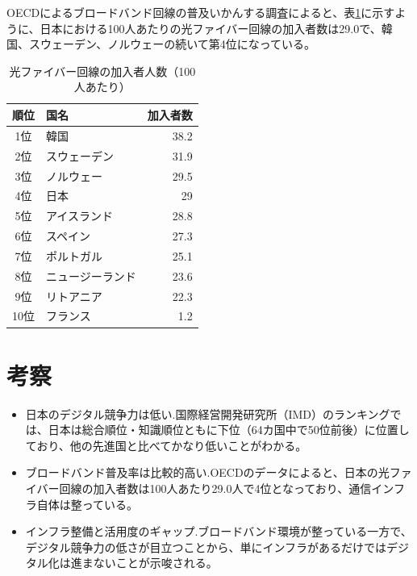\documentclass[a4paper,11pt,dvipdfmx]{ujarticle}
\begin{document}
OECDによるブロードバンド回線の普及いかんする調査\cite{oecd}によると、表\ref{fig:表の挿入}に示すように、日本における100人あたりの光ファイバー回線の加入者数は29.0で、韓国、スウェーデン、ノルウェーの続いて第4位になっている。
\begin{table}[htbp]
     \centering
     \caption{光ファイバー回線の加入者人数（100人あたり）}\label{fig:表の挿入}
     \begin{tabular}{|c|l|r|}
         \hline
          順位 & 国名 & 加入者数 \\
          \hline
          1位 & 韓国 & 38.2 \\
          \hline
         2位 & スウェーデン & 31.9 \\
         \hline
         3位 & ノルウェー & 29.5 \\
         \hline
         4位 & 日本 & 29 \\
         \hline
         5位 & アイスランド & 28.8 \\
         \hline
         6位 & スペイン & 27.3 \\
         \hline
         7位 & ポルトガル & 25.1 \\
         \hline
         8位 & ニュージーランド & 23.6 \\
         \hline
         9位 & リトアニア & 22.3 \\
         \hline
         10位 & フランス & 1.2 \\
          \hline
    \end{tabular}
\end{table}


\section{考察}
\begin{itemize}
    \item 日本のデジタル競争力は低い.国際経営開発研究所（IMD）のランキングでは、日本は総合順位・知識順位ともに下位（64カ国中で50位前後）に位置しており、他の先進国と比べてかなり低いことがわかる。
    \item ブロードバンド普及率は比較的高い.OECDのデータによると、日本の光ファイバー回線の加入者数は100人あたり29.0人で4位となっており、通信インフラ自体は整っている。
    \item インフラ整備と活用度のギャップ.ブロードバンド環境が整っている一方で、デジタル競争力の低さが目立つことから、単にインフラがあるだけではデジタル化は進まないことが示唆される。
\end{itemize}
\end{document}
